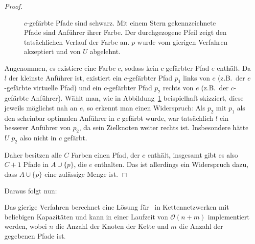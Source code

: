 \begin{proof}
	\begin{figure}[htbp]
		\centering
		\def\svgwidth{300bp}
		
		\caption{$c$-gefärbte Pfade sind schwarz. Mit einem Stern gekennzeichnete Pfade sind Anführer ihrer Farbe.
		Der durchgezogene Pfeil zeigt den tatsächlichen Verlauf der Farbe an. $p$ wurde vom gierigen Verfahren akzeptiert und von $U$ abgelehnt.}
		\label{fig:proof-chain-greedy-arbitrary}
	\end{figure}

    Angenommen, es existiere eine Farbe $c$, sodass kein $c$-gefärbter Pfad $e$ enthält.
    Da $l$ der kleinste Anführer ist, existiert ein $c$-gefärbter Pfad $p_1$ links von $e$ (z.B.\ der $c$-gefärbte virtuelle Pfad) und ein $c$-gefärbter Pfad $p_2$
    rechts von $e$ (z.B.\ der $c$-gefärbte Anführer).
    Wählt man, wie in Abbildung~\ref{fig:proof-chain-greedy-arbitrary} beispielhaft skizziert, diese jeweils möglichst nah an $e$, so erkennt man einen Widerspruch:
    Als $p_2$ mit $p_1$ als den scheinbar optimalen Anführer in $c$ gefärbt wurde, war tatsächlich $l$
    ein besserer Anführer von $p_2$, da sein Zielknoten weiter rechts ist.
    Insbesondere hätte $U$ $p_2$ also nicht in $c$ gefärbt.

    Daher besitzen alle $C$ Farben einen Pfad, der $e$ enthält, insgesamt gibt es also $C+1$ Pfade in $A \cup \{p\}$, die
    $e$ enthalten.
    Das ist allerdings ein Widerspruch dazu, dass $A \cup \{p\}$ eine zulässige Menge ist.
\end{proof}

Daraus folgt nun:

\begin{theorem}\label{theorem:greedyAlgorithm}
    Das gierige Verfahren berechnet eine Lösung für \CallControl\ in Kettennetzwerken mit beliebigen Kapazitäten und kann in einer Laufzeit von
    $\mathcal O(n+m)$ implementiert werden, wobei $n$ die Anzahl der Knoten der Kette und $m$ die Anzahl der gegebenen Pfade ist.
\end{theorem}
